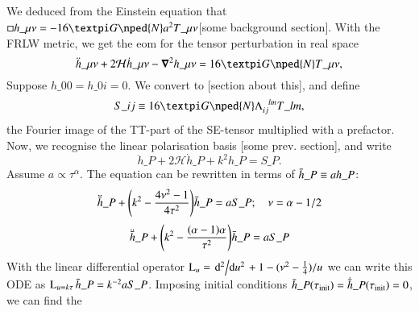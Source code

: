 


\subsection{}
    We deduced from the Einstein equation that $\sq h\_{\mu\nu} =- 16 \ppi G\nped{N} a^2T\_{\mu\nu}$\nc{}[some background section]. With the FRLW metric, we get the eom for the tensor perturbation in real space
    \begin{equation}
        \ddot{h}\_{\mu\nu}+ 2 \mathcal{H} \dot{h}\_{\mu\nu} -\vec{\nabla}^2 h\_{\mu\nu} = 16\ppi G\nped{N} T\_{\mu\nu},
    \end{equation}
    Suppose $h\_{00}=h\_{0i}=0$. We convert to [section about this], and define
    \begin{equation}
        S\_{ij} \equiv 16\ppi G\nped{N} \Lambda\indices{_{ij}^{lm}} T\_{lm},%
    \end{equation}
    the Fourier image of the TT-part of the SE-tensor multiplied with a prefactor.
    Now, we recognise the linear polarisation basis [some prev. section], and write
    \begin{equation}
        \ddot{h}\_{P} + 2 \mathcal{H} \dot{h}\_{P} + k^2 h\_{P} = S\_{P}.
    \end{equation}
    Assume $a\propto \tau^\alpha$. The equation can be rewritten in terms of $\bar{h}\_{P}\equiv a h\_P$:
    \begin{equation}
        \ddot{\bar{h}}\_P + {\left( k^2-\frac{4\nu^2 - 1}{4\tau^2} \right)}\bar{h}\_P = a S\_P; \quad \nu = \alpha - 1/2
    \end{equation}
    \begin{equation}
        \ddot{\bar{h}}\_P + {\left( k^2-\frac{(\alpha-1)\alpha}{\tau^2} \right)}\bar{h}\_P = a S\_P
    \end{equation}
    With the linear differential operator $\mathop{\mathrm{L}_{u}}=\dv*[2]{}{u} + 1 - (\nu^2-\frac{1}{4})/u$ we can write this ODE as $\mathop{\mathrm{L}_{u=k\tau}} \bar{h}\_P=  k^{-2}a S\_P$. Imposing initial conditions $\bar{h}\_P(\tau_\mathrm{init})= \dot{\bar{h}}\_P(\tau_\mathrm{init})=0$, we can find the 
